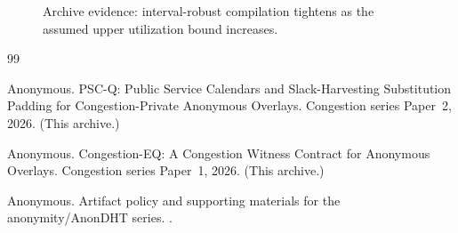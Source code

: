 \documentclass[11pt]{article}
\theoremstyle{definition}
\theoremstyle{remark}
\begin{document}
\begin{figure}[t]
\centering
{}
\caption{Archive evidence: interval-robust compilation tightens as the assumed upper utilization bound increases.}
\label{fig:utilrangeopt}
\end{figure}

\begin{thebibliography}{99}

Anonymous.
\newblock PSC-Q: Public Service Calendars and Slack-Harvesting Substitution Padding for Congestion-Private Anonymous Overlays.
\newblock Congestion series Paper~2, 2026. (This archive.)

Anonymous.
\newblock Congestion-EQ: A Congestion Witness Contract for Anonymous Overlays.
\newblock Congestion series Paper~1, 2026. (This archive.)

Anonymous.
\newblock Artifact policy and supporting materials for the anonymity/AnonDHT series.
.
\end{thebibliography}
\end{document}
